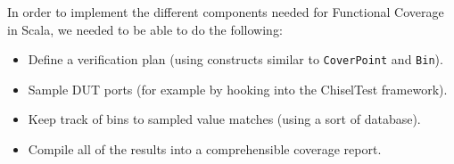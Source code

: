 \documentclass[conference]{IEEEtran}
\begin{document}
%
%
%

In order to implement the different components needed for Functional Coverage in Scala, we needed to be able to do the following:

\begin{itemize}
  \item Define a verification plan (using constructs similar to \texttt{CoverPoint} and \texttt{Bin}).
  \item Sample DUT ports (for example by hooking into the ChiselTest framework).
  \item Keep track of bins to sampled value matches (using a sort of database).
  \item Compile all of the results into a comprehensible coverage report.
\end{itemize}
\end{document}
